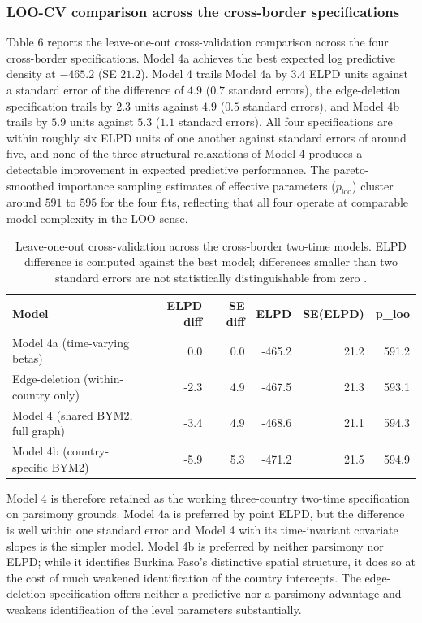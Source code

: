 \documentclass{article}
\begin{document}
\subsubsection{LOO-CV comparison across the cross-border
specifications}\label{loo-cv-comparison-across-the-cross-border-specifications}

Table 6 reports the leave-one-out cross-validation comparison across the
four cross-border specifications. Model 4a achieves the best expected
log predictive density at \(-465.2\) (SE \(21.2\)). Model 4 trails Model
4a by \(3.4\) ELPD units against a standard error of the difference of
\(4.9\) (\(0.7\) standard errors), the edge-deletion specification
trails by \(2.3\) units against \(4.9\) (\(0.5\) standard errors), and
Model 4b trails by \(5.9\) units against \(5.3\) (\(1.1\) standard
errors). All four specifications are within roughly six ELPD units of
one another against standard errors of around five, and none of the
three structural relaxations of Model 4 produces a detectable
improvement in expected predictive performance. The pareto-smoothed
importance sampling estimates of effective parameters (\(p_\text{loo}\))
cluster around \(591\) to \(595\) for the four fits, reflecting that all
four operate at comparable model complexity in the LOO sense.

\begingroup\fontsize{8}{10}\selectfont

\begin{longtable}[t]{lrrrrr}
\caption{\label{tab:sens-loo}Leave-one-out cross-validation across the cross-border two-time models. ELPD difference is computed against the best model; differences smaller than two standard errors are not statistically distinguishable from zero \citep{vehtari2017}. \label{tab:sens-loo}}\\
\toprule
Model & ELPD diff & SE diff & ELPD & SE(ELPD) & p\_loo\\
\midrule
Model 4a (time-varying betas) & 0.0 & 0.0 & -465.2 & 21.2 & 591.2\\
Edge-deletion (within-country only) & -2.3 & 4.9 & -467.5 & 21.3 & 593.1\\
Model 4 (shared BYM2, full graph) & -3.4 & 4.9 & -468.6 & 21.1 & 594.3\\
Model 4b (country-specific BYM2) & -5.9 & 5.3 & -471.2 & 21.5 & 594.9\\
\bottomrule
\end{longtable}
\endgroup{}

Model 4 is therefore retained as the working three-country two-time
specification on parsimony grounds. Model 4a is preferred by point ELPD,
but the difference is well within one standard error and Model 4 with
its time-invariant covariate slopes is the simpler model. Model 4b is
preferred by neither parsimony nor ELPD; while it identifies Burkina
Faso's distinctive spatial structure, it does so at the cost of much
weakened identification of the country intercepts. The edge-deletion
specification offers neither a predictive nor a parsimony advantage and
weakens identification of the level parameters substantially.
\end{document}
